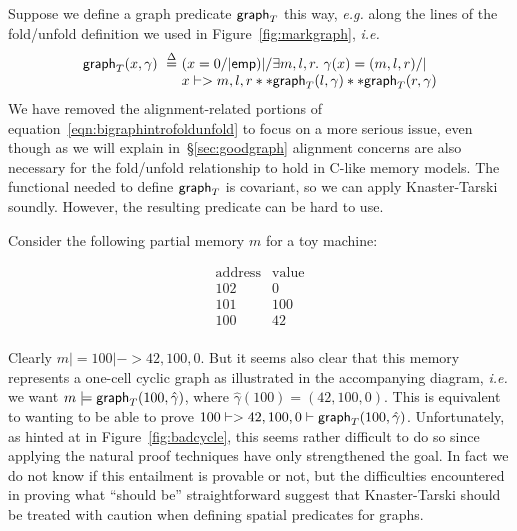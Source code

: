 
Suppose we define a graph predicate $\mathsf{graph}_T$ this way, \emph{e.g.} along the lines of the fold/unfold definition we used in Figure~\ref{fig:markgraph}, \emph{i.e.}
\[
\begin{array}{@{}l@{}l@{}}
\graphkt(x, \gamma) ~ \stackrel{\Delta}{=} ~ & (x = 0 /| \p{emp}) |/ \exists m,l,r.~ \gamma(x)=(m,l,r) /| \null \\
& x |-> m,l,r ** \graphkt(l, \gamma) ** \graphkt(r, \gamma)
\end{array}
\]
We have removed the alignment-related portions of equation~\eqref{eqn:bigraphintrofoldunfold} to focus on a more serious issue, even though as we will explain in~\S\ref{sec:goodgraph} alignment concerns are also necessary for the fold/unfold relationship to hold in C-like memory models.  The functional needed to define $\mathsf{graph}_T$ is covariant, so we can apply Knaster-Tarski soundly.  However, the resulting predicate can be hard to use.

Consider the following partial memory $m$ for a toy machine:

\begin{minipage}{.24\textwidth}
\qquad \[
\begin{array}{l|l}
\textrm{address} & \textrm{value} \\
\hline
102 & 0 \\
101 & 100 \\
100 & 42 \\
\end{array}
\]
\end{minipage}
\begin{minipage}{.19\textwidth}
\centering
{}
\endpgfgraphicnamed
\end{minipage}
\vspace{0.75ex}

\noindent Clearly $m |= 100 |-> 42,100,0$.  But it seems also clear that this memory represents a one-cell cyclic graph as illustrated in the accompanying diagram, \emph{i.e.} we want $m |= \mathsf{graph}_T(100,\hat{\gamma})$, where $\hat{\gamma}(100) = (42,100,0)$.  This is equivalent to wanting to be able to prove $100 |-> 42,100,0 |- \mathsf{graph}_T(100,\hat{\gamma})$.  Unfortunately, as hinted at in Figure~\ref{fig:badcycle}, this seems rather difficult to do so since applying the natural proof techniques have only strengthened the goal.  In fact we do not know if this entailment is provable or not, but the difficulties encountered in proving what ``should be'' straightforward suggest that Knaster-Tarski should be treated with caution when defining spatial predicates for graphs.


